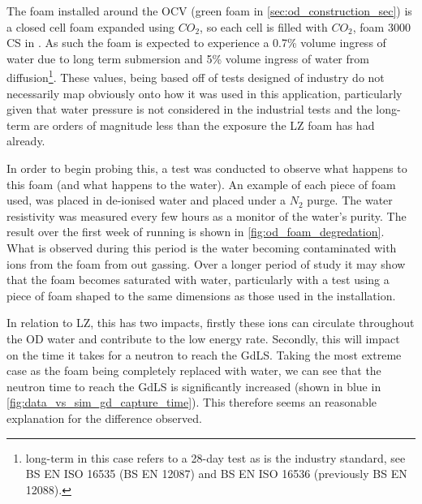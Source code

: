 \par
The foam installed around the OCV (green foam in \autoref{sec:od_construction_sec}) is a closed cell foam expanded using $CO_2$, so each cell is filled with $CO_2$, foam 3000 CS in \cite{styrodur_water_ingress_ref}.
As such the foam is expected to experience a 0.7\% volume ingress of water due to long term submersion and 5\% volume ingress of water from diffusion\footnote{long-term in this case refers to a 28-day test as is the industry standard, see BS EN ISO 16535 (BS EN 12087) and BS EN ISO 16536 (previously BS EN 12088).}.
These values, being based off of tests designed of industry do not necessarily map obviously onto how it was used in this application, particularly given that water pressure is not considered in the industrial tests and the long-term are orders of magnitude less than the exposure the LZ foam has had already.
\par
In order to begin probing this, a test was conducted to observe what happens to this foam (and what happens to the water).
An example of each piece of foam used, was placed in de-ionised water and placed under a $N_2$ purge. 
The water resistivity was measured every few hours as a monitor of the water's purity.
The result over the first week of running is shown in \autoref{fig:od_foam_degredation}.
What is observed during this period is the water becoming contaminated with ions from the foam from out gassing.
Over a longer period of study it may show that the foam becomes saturated with water, particularly with a test using a piece of foam shaped to the same dimensions as those used in the installation.

\par
In relation to LZ, this has two impacts, firstly these ions can circulate throughout the OD water and contribute to the low energy rate.
Secondly, this will impact on the time it takes for a neutron to reach the GdLS.
Taking the most extreme case as the foam being completely replaced with water, we can see that the neutron time to reach the GdLS is significantly increased (shown in blue in \autoref{fig:data_vs_sim_gd_capture_time}).
This therefore seems an reasonable explanation for the difference observed.




